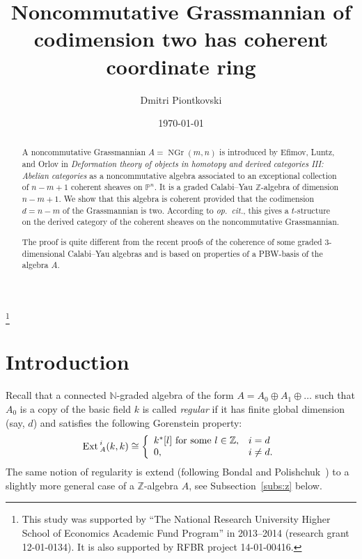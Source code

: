 \documentclass{amsart}
\numberwithin{equation}{section}
\theoremstyle{plain}
\theoremstyle{definition}
\begin{document}
\title{Noncommutative Grassmannian of codimension two has coherent coordinate ring}

\author{Dmitri Piontkovski}

      \address{Department of Mathematics for Economics,
Myasnitskaya str. 20, State University `Higher School of Economics', Moscow 101990, Russia
}

\thanks{This study was supported by ``The National Research University Higher School of Economics Academic Fund Program'' in 2013--2014 (research grant 12-01-0134).  
It is also supported by RFBR project 14-01-00416.}



\date{\today}

\begin{abstract}
A noncommutative Grassmannian $A ={\mathop{\mathrm{NGr}}\nolimits}(m,n)$ is introduced by Efimov, Luntz, and Orlov in
 {\em Deformation theory of objects in homotopy and derived categories III: Abelian categories}
 as a noncommutative algebra associated to an exceptional collection of $n-m+1$ coherent sheaves on ${\ensuremath{\mathbb P}}^n$.
 It is a graded Calabi--Yau ${\ensuremath{\mathbb Z}}$-algebra of dimension $n-m+1$. 
 We show that this algebra is coherent provided that the codimension $d=n-m$ of the Grassmannian is two. According to {\em op.~cit.}, this gives a $t$-structure on the 
 derived category of the coherent sheaves on the noncommutative Grassmannian.
 
 

 The proof is quite different from the recent proofs of the coherence of some graded 3-dimensional Calabi--Yau algebras and is based on  properties of a PBW-basis of the algebra $A$. 
\end{abstract}

\maketitle

\section{Introduction}

Recall that 
a connected  {\ensuremath{\mathbb N}}-graded algebra of the form $A = A_0 \oplus
A_1 \oplus \dots $ such that  $A_0$ is a copy of the basic field  $k$ is called {\em regular}  if
it has finite global dimension (say, $d$) and satisfies the
following Gorenstein property:
$$
{\mbox{Ext\,}}^i_A(k,k) \cong\left\{ \begin{array}{ll}
k^* [l] \mbox{ for some } l\in {\ensuremath{\mathbb Z}} ,& i =d \\
 0, & i\ne d .
\end{array}  \right.
$$
The same notion of regularity is extend (following Bondal and Polishchuk~\cite{bp}) to a slightly more general case of a ${\ensuremath{\mathbb Z}}$-algebra $A$, see Subsection~\ref{subs:z} below.
\end{document}

